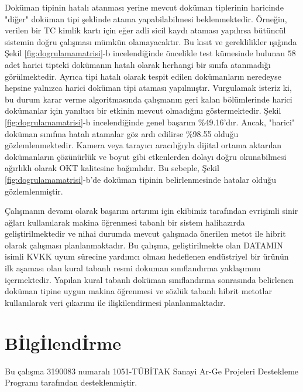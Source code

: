 \documentclass[conference, a4paper]{IEEEtran}
\begin{document}
Doküman tipinin hatalı atanması yerine mevcut doküman tiplerinin haricinde "diğer" doküman tipi şeklinde atama
yapabilabilmesi beklenmektedir. Örneğin, verilen bir TC kimlik kartı için eğer adli sicil kaydı ataması yapılırsa
bütüncül sistemin doğru çalışması mümkün olamayacaktır. Bu kısıt ve gereklilikler ışığında Şekil
\ref{fig:dogrulamamatrisi}-b incelendiğinde öncelikle test kümesinde bulunan $58$ adet harici tipteki dokümanın hatalı
olarak herhangi bir sınıfa atanmadığı görülmektedir. Ayrıca tipi hatalı olarak tespit edilen dokümanların neredeyse
hepsine yalnızca harici doküman tipi ataması yapılmıştır. Vurgulamak isteriz ki, bu durum karar verme algoritmasında
çalışmanın geri kalan bölümlerinde harici dokümanlar için yanıltıcı bir etkinin mevcut olmadığını göstermektedir. Şekil
\ref{fig:dogrulamamatrisi}-b incelendiğinde genel başarım \%49.16'dır. Ancak, "harici" doküman sınıfına hatalı
atamalar göz ardı edilirse \%98.55 olduğu gözlemlenmektedir. Kamera veya tarayıcı aracılığıyla dijital ortama aktarılan
dokümanların çözünürlük ve boyut gibi etkenlerden dolayı doğru okunabilmesi ağırlıklı olarak OKT kalitesine bağımlıdır.
Bu sebeple, Şekil \ref{fig:dogrulamamatrisi}-b'de doküman tipinin belirlenmesinde hatalar olduğu gözlemlenmiştir.

Çalışmanın devamı olarak başarım artırımı için ekibimiz tarafından evrişimli sinir ağları kullanılarak makina
öğrenmesi tabanlı bir sistem halihazırda geliştirilmektedir ve nihai durumda mevcut çalışmada önerilen metot ile hibrit
olarak çalışması planlanmaktadır. Bu çalışma, geliştirilmekte olan DATAMIN isimli KVKK uyum sürecine yardımcı olması
hedeflenen endüstriyel bir ürünün ilk aşaması olan kural tabanlı resmi dokuman sınıflandırma yaklaşımını içermektedir.
Yapılan kural tabanlı doküman sınıflandırma sonrasında belirlenen doküman tipine uygun makina öğrenmesi ve sözlük
tabanlı hibrit metotlar kullanılarak veri çıkarımı ile ilişkilendirmesi planlanmaktadır.

\section*{B{\footnotesize İ}lg{\footnotesize İ}lend{\footnotesize İ}rme}
Bu çalışma 3190083 numaralı 1051-TÜBİTAK Sanayi Ar-Ge Projeleri Destekleme Programı tarafından desteklenmiştir.



\end{document}

